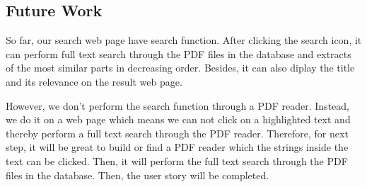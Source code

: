 
\subsection{Future Work}
So far, our search web page have search function. After clicking the search icon, it can perform full text search through the PDF files in the database and extracts of the most similar parts in decreasing order. Besides, it can also diplay the title and its relevance on the result web page.

However, we don't perform the search function through a PDF reader. Instead, we do it on a web page which means we can not click on a highlighted text and thereby perform a full text search through the PDF reader. Therefore, for next step, it will be great to build or find a PDF reader which the strings inside the text can be clicked. Then, it will perform the full text search through the PDF files in the database. Then, the user story will be completed.